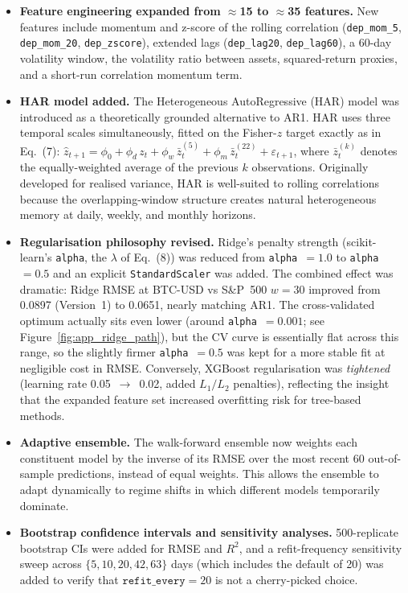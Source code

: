 \begin{itemize}
    \item \textbf{Feature engineering expanded from $\approx$15 to $\approx$35 features.}
          New features include momentum and z-score of the rolling correlation
          (\texttt{dep\_mom\_5}, \texttt{dep\_mom\_20}, \texttt{dep\_zscore}),
          extended lags (\texttt{dep\_lag20}, \texttt{dep\_lag60}), a 60-day volatility
          window, the volatility ratio between assets, squared-return proxies, and a
          short-run correlation momentum term.
    \item \textbf{HAR model added.}
          The Heterogeneous AutoRegressive (HAR) model
          \cite{corsi2009har}
          was introduced as a theoretically grounded alternative to AR1.
          HAR uses three temporal scales simultaneously, fitted on the Fisher-$z$
          target exactly as in Eq.~(7):
          $\hat{z}_{t+1} = \phi_0 + \phi_d\,z_t + \phi_w\,\bar{z}^{(5)}_t + \phi_m\,\bar{z}^{(22)}_t + \varepsilon_{t+1}$,
          where $\bar{z}^{(k)}_t$ denotes the equally-weighted average of the previous
          $k$ observations.
          Originally developed for realised variance, HAR is well-suited to rolling
          correlations because the overlapping-window structure creates natural
          heterogeneous memory at daily, weekly, and monthly horizons.
    \item \textbf{Regularisation philosophy revised.}
          Ridge's penalty strength (scikit-learn's \texttt{alpha}, the $\lambda$ of
          Eq.~(8)) was reduced from \texttt{alpha}~$= 1.0$ to \texttt{alpha}~$= 0.5$
          and an explicit \texttt{StandardScaler} was added.
          The combined effect was dramatic: Ridge RMSE at BTC-USD vs S\&P~500 $w = 30$
          improved from 0.0897 (Version~1) to 0.0651, nearly matching AR1.
          The cross-validated optimum actually sits even lower (around
          \texttt{alpha}~$= 0.001$; see Figure~\ref{fig:app_ridge_path}), but the CV
          curve is essentially flat across this range, so the slightly firmer
          \texttt{alpha}~$= 0.5$ was kept for a more stable fit at negligible cost in RMSE.
          Conversely, XGBoost regularisation was \emph{tightened} (learning rate
          0.05~$\to$~0.02, added $L_1/L_2$ penalties), reflecting the insight that
          the expanded feature set increased overfitting risk for tree-based methods.
    \item \textbf{Adaptive ensemble.}
          The walk-forward ensemble now weights each constituent model by the inverse of
          its RMSE over the most recent 60 out-of-sample predictions, instead of
          equal weights.
          This allows the ensemble to adapt dynamically to regime shifts in which
          different models temporarily dominate.
    \item \textbf{Bootstrap confidence intervals and sensitivity analyses.}
          500-replicate bootstrap CIs were added for RMSE and $R^2$,
          and a refit-frequency sensitivity sweep across
          $\{5, 10, 20, 42, 63\}$ days (which includes the default of 20)
          was added to verify that $\texttt{refit\_every} = 20$ is not a
          cherry-picked choice.
\end{itemize}


